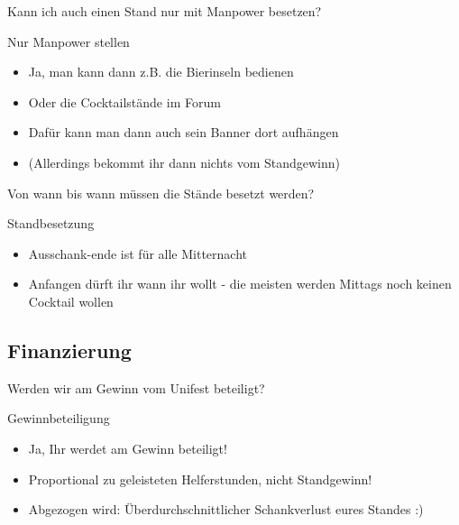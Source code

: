 \begin{frame}[standout]
    Kann ich auch einen Stand nur mit Manpower besetzen?
\end{frame}

\begin{frame}[c]{Nur Manpower stellen}
    \begin{itemize}[<+(1)->]
        \item Ja, man kann dann z.B. die Bierinseln bedienen
        \item Oder die Cocktailstände im Forum
        \item Dafür kann man dann auch sein Banner dort aufhängen
        \item (Allerdings bekommt ihr dann nichts vom Standgewinn)
    \end{itemize}
\end{frame}

\begin{frame}[standout]
    Von wann bis wann müssen die Stände besetzt werden?
\end{frame}

\begin{frame}[c]{Standbesetzung}
    \begin{itemize}[<+(1)->]
        \item Ausschank-ende ist für alle Mitternacht
        \item Anfangen dürft ihr wann ihr wollt - die meisten werden Mittags noch keinen Cocktail wollen
    \end{itemize}
\end{frame}

\subsection{Finanzierung}

\begin{frame}[standout]
    Werden wir am Gewinn vom Unifest beteiligt?
\end{frame}


\begin{frame}[c]{Gewinnbeteiligung}
    \begin{itemize}[<+(1)->]
        \item Ja, Ihr werdet am Gewinn beteiligt!
        \item Proportional zu geleisteten Helferstunden, nicht Standgewinn!
        \item Abgezogen wird: Überdurchschnittlicher Schankverlust eures Standes :)
    \end{itemize}
\end{frame}


